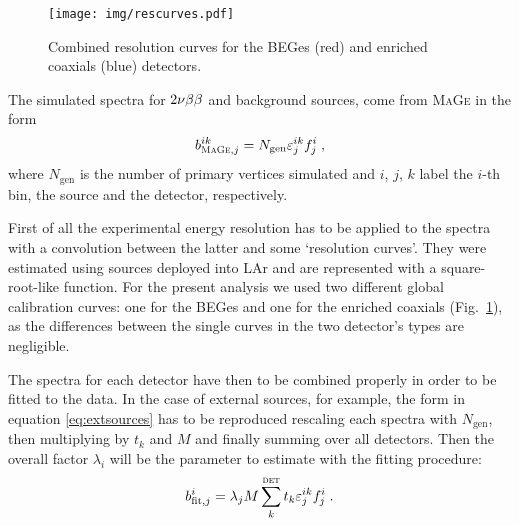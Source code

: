 \begin{figure}
	\centering
	\texttt{[image: img/rescurves.pdf]}
	\caption{Combined resolution curves for the BEGes (red) and enriched coaxials (blue) detectors.}\label{fig:rescurves}
\end{figure}
 The simulated spectra for $2\nbb$ and background sources, come from \textsc{MaGe} in the form
\begin{equation}b^{ik}_{\textsc{MaGe},j}=N_\text{gen}\epsilon^{ik}_jf_j^i\;,\end{equation}
where $N_\text{gen}$ is the number of primary vertices simulated and $i$, $j$, $k$ label the $i$-th bin, the source and the detector, respectively.

First of all the experimental energy resolution has to be applied to the spectra with a convolution between the latter and some `resolution curves'. They were estimated using  sources deployed into LAr and are represented with a square-root-like function. For the present analysis we used two different global calibration curves: one for the BEGes and one for the enriched coaxials (Fig.~\ref{fig:rescurves}), as the differences between the single curves in the two detector's types are negligible.

The spectra for each detector have then to be combined properly in order to be fitted to the data. In the case of external sources, for example, the form in equation \ref{eq:extsources} has to be reproduced rescaling each spectra with $N_\text{gen}$, then multiplying by $t_k$ and $M$ and finally summing over all detectors. Then the overall factor $\lambda_i$ will be the parameter to estimate with the fitting procedure:
\begin{equation}b_{\text{fit},j}^i=\lambda_jM\sum_k^\textsc{det}t_k\epsilon_j^{ik}f_j^i\;.\end{equation}

